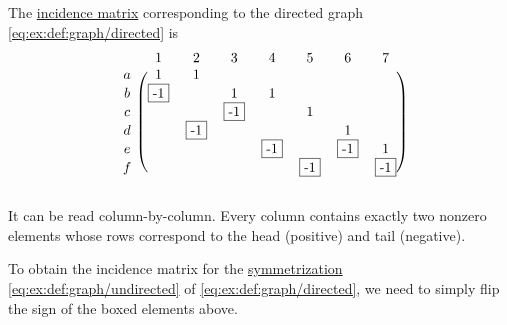 \begin{example}\label{ex:def:graph_matrices}
  The \hyperref[def:graph_matrices/incidence]{incidence matrix} corresponding to the directed graph \eqref{eq:ex:def:graph/directed} is
  \begin{equation}\label{ex:def:graph_matrices/incidence}
    \begin{blockarray}{cccccccc}
        & 1         & 2         & 3         & 4         & 5         & 6         & 7         \\
      \begin{block}{c(ccccccc)}
      a & 1         & 1         &           &           &           &           &           \\
      b & \fbox{-1} &           & 1         & 1         &           &           &           \\
      c &           &           & \fbox{-1} &           & 1         &           &           \\
      d &           & \fbox{-1} &           &           &           & 1         &           \\
      e &           &           &           & \fbox{-1} &           & \fbox{-1} & 1         \\
      f &           &           &           &           & \fbox{-1} &           & \fbox{-1} \\
      \end{block}
    \end{blockarray}
  \end{equation}

  It can be read column-by-column. Every column contains exactly two nonzero elements whose rows correspond to the head (positive) and tail (negative).

  To obtain the incidence matrix for the \hyperref[rem:undirected_graphs_as_directed]{symmetrization} \eqref{eq:ex:def:graph/undirected} of \eqref{eq:ex:def:graph/directed}, we need to simply flip the sign of the boxed elements above.


\end{example}
